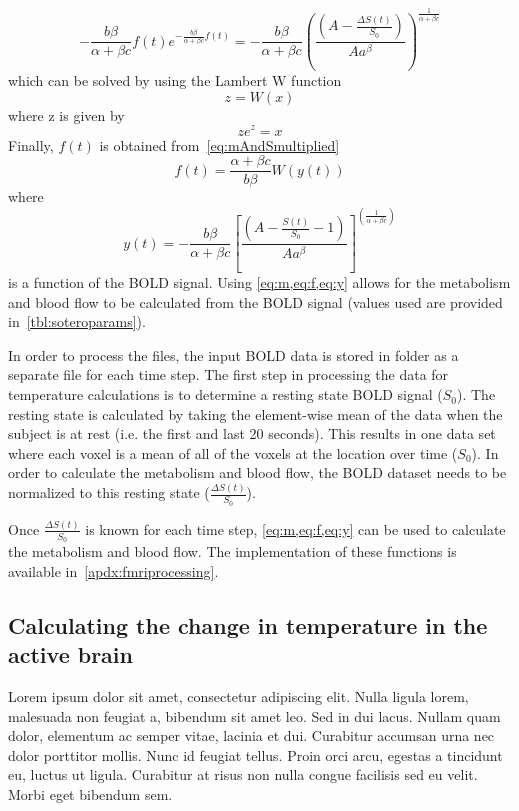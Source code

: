     \begin{equation} \label{eq:mAndSmultiplied}
      -\frac{b\beta}{\alpha+\beta c} f(t)e^{-\frac{b \beta}{\alpha + \beta c}f(t)}=-\frac{b\beta}{\alpha+\beta c} \left(\frac{\left(A-\frac{\Delta S(t)}{S_0}\right)}{A a^\beta}\right)^{\frac{1}{\alpha+\beta c}}
    \end{equation}
  which can be solved by using the Lambert W function
    \begin{equation} \label{eq:lambertW}
      z=W(x)
    \end{equation}
  where z is given by
    \begin{equation} \label{eq:lambertWsetup}
      z e^z = x
    \end{equation}
  Finally, $f(t)$ is obtained from~\cref{eq:mAndSmultiplied}
    \begin{equation} \label{eq:f}
      f(t)=\frac{\alpha+\beta c}{b \beta}W(y(t))
    \end{equation}
  where
    \begin{equation} \label{eq:y} 
    	y(t)=-\frac{b \beta}{\alpha+\beta c} \left[\frac{(A-\frac{S(t)}{S_{0}}-1)}{A a^{\beta}}\right]^{\left(\frac{1}{\alpha+\beta c}\right)} 
    \end{equation}
  is a function of the BOLD signal.  Using \cref{eq:m,eq:f,eq:y} allows for the metabolism and blood flow to be calculated from the BOLD signal (values used are provided in~\cref{tbl:soteroparams}).
  
    In order to process the files, the input BOLD data is stored in folder as a separate file for each time step.  The first step in processing the data for temperature calculations is to determine a resting state BOLD signal ($S_0$).  The resting state is calculated by taking the element-wise mean of the data when the subject is at rest (i.e. the first and last 20 seconds).  This results in one data set where each voxel is a mean of all of the voxels at the location over time ($S_0$).  In order to calculate the metabolism and blood flow, the BOLD dataset needs to be normalized to this resting state ($\frac{\Delta S(t)}{S_0}$).  
    
    Once $\frac{\Delta S(t)}{S_0}$ is known for each time step, \cref{eq:m,eq:f,eq:y} can be used to calculate the metabolism and blood flow. The implementation of these functions is available in~\cref{apdx:fmriprocessing}. 

    \subsection{\label{sec:calcT} Calculating the change in temperature in the active brain}
    Lorem ipsum dolor sit amet, consectetur adipiscing elit. Nulla ligula lorem, malesuada non feugiat a, bibendum sit amet leo. Sed in dui lacus. Nullam quam dolor, elementum ac semper vitae, lacinia et dui. Curabitur accumsan urna nec dolor porttitor mollis. Nunc id feugiat tellus. Proin orci arcu, egestas a tincidunt eu, luctus ut ligula. Curabitur at risus non nulla congue facilisis sed eu velit. Morbi eget bibendum sem.

